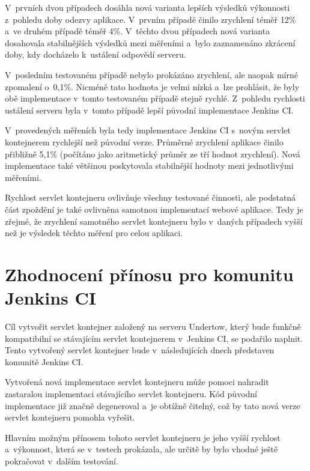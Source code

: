         V~prvních dvou případech dosáhla nová varianta lepších výsledků
        výkonnosti z~pohledu doby odezvy aplikace. V~prvním případě činilo zrychlení téměř 12\%
        a~ve druhém případě téměř 4\%. V~těchto dvou případech nová varianta
        dosahovala stabilnějších výsledků mezi měřeními a~bylo zaznamenáno 
        zkrácení doby, kdy docházelo k~ustálení odpovědí serveru.

        V~posledním testovaném případě nebylo prokázáno zrychlení, ale naopak mírné zpomalení
        o~0,1\%. Nicméně tato hodnota je velmi nízká a~lze prohlásit, že
        byly obě implementace v~tomto testovaném případě stejně rychlé. 
        Z~pohledu rychlosti ustálení serveru byla v~tomto případě lepší původní
        implementace Jenkins CI.

        \medskip
        V~provedených měřeních byla tedy implementace Jenkins CI s~novým
        servlet kontejnerem rychlejší než původní verze. Průměrné zrychlení
        aplikace činilo přibližně 5,1\% (počítáno jako aritmetický průměr ze tří hodnot zrychlení).
        Nová implementace také většinou poskytovala stabilnější hodnoty mezi jednotlivými měřeními.

        Rychlost servlet kontejneru ovlivňuje všechny testované činnosti, ale podstatná část
        zpoždění je také ovlivněna samotnou implementací webové aplikace. Tedy je zřejmé, 
        že zrychlení samotného servlet kontejneru bylo v~daných případech vyšší než
        je výsledek těchto měření pro celou aplikaci.

    \section{Zhodnocení přínosu pro komunitu Jenkins CI} \label{kapPrinos}
        Cíl vytvořit servlet kontejner založený na serveru Undertow, který bude
        funkčně kompatibilní se stávajícím servlet kontejnerem v~Jenkins CI, se podařilo
        naplnit. Tento vytvořený servlet kontejner bude v~následujících dnech
        představen komunitě Jenkins CI.

        Vytvořená nová implementace servlet kontejneru  
        může pomoci nahradit zastaralou implementaci stávajícího servlet kontejneru.
        Kód původní implementace již značně degeneroval
        a~je obtížně čitelný, což by tato nová verze servlet kontejneru pomohla vyřešit.

        Hlavním možným přínosem tohoto servlet kontejneru je jeho vyšší
        rychlost a~výkonnost, která se v~testech prokázala, ale
        určitě by bylo vhodné ještě pokračovat v~dalším testování.

